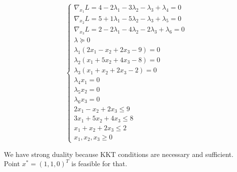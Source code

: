 \begin{equation*}
    \begin{cases}
    \nabla_{x_1} L = 4  - 2\lambda_1 - 3\lambda_2 - \lambda_3 + \lambda_4 = 0 \\
    \nabla_{x_2} L = 5  + 1\lambda_1  - 5\lambda_2 - \lambda_3 + \lambda_5 = 0 \\
    \nabla_{x_3} L = 2  - 2\lambda_1 - 4\lambda_2 - 2\lambda_3 + \lambda_6 = 0 \\
    
    \lambda \succcurlyeq 0 \\
    \lambda_1 (2x_1 - x_2 + 2x_3 - 9) = 0 \\
    \lambda_2 (x_1 + 5x_2 + 4x_3 - 8) = 0 \\
    \lambda_3 (x_1 + x_2 + 2x_3 - 2) = 0 \\
    \lambda_4 x_1 = 0 \\
    \lambda_5 x_2 = 0 \\
    \lambda_6 x_3 = 0 \\
    2x_1 - x_2 + 2x_3 \leq 9 \\
    3x_1 + 5x_2 + 4x_3 \leq 8 \\
    x_1 + x_2 + 2x_3 \leq 2 \\
    x_1, x_2, x_3 \geq 0
    \end{cases}
\end{equation*}


We have strong duality because KKT conditions are necessary and sufficient. 
Point $x^* = (1, 1, 0)^T$ is feasible for that. 
